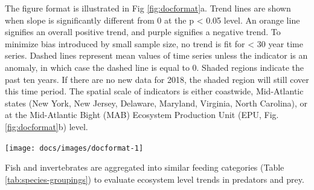 \documentclass[
  10pt,
]{article}
\let\origfigure\figure
\let\endorigfigure\endfigure
\renewenvironment{figure}[1][2] {
    \expandafter\origfigure\expandafter[H]
} {
    \endorigfigure
}
\begin{document}
The figure format is illustrated in Fig \ref{fig:docformat}a. Trend
lines are shown when slope is significantly different from 0 at the p
\textless{} 0.05 level. An orange line signifies an overall positive
trend, and purple signifies a negative trend. To minimize bias
introduced by small sample size, no trend is fit for \textless{} 30 year
time series. Dashed lines represent mean values of time series unless
the indicator is an anomaly, in which case the dashed line is equal to
0. Shaded regions indicate the past ten years. If there are no new data
for 2018, the shaded region will still cover this time period. The
spatial scale of indicators is either coastwide, Mid-Atlantic states
(New York, New Jersey, Delaware, Maryland, Virginia, North Carolina), or
at the Mid-Atlantic Bight (MAB) Ecosystem Production Unit (EPU, Fig.
\ref{fig:docformat}b) level.

\begin{figure}

{\centering \texttt{[image: docs/images/docformat-1]} 

}

\caption{Document orientation. a. Key to figures. b.The Northeast Large Marine Ecosystem.}\label{fig:docformat}
\end{figure}

Fish and invertebrates are aggregated into similar feeding categories
(Table \ref{tab:species-groupings}) to evaluate ecosystem level trends
in predators and prey.
\end{document}
